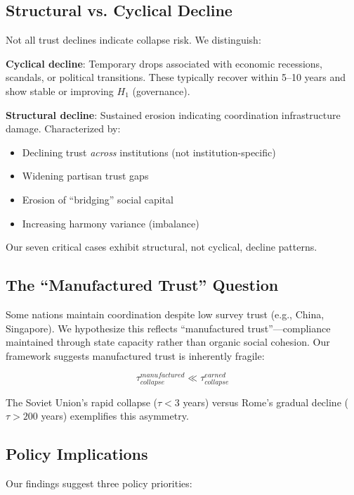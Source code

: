 \documentclass[11pt,a4paper]{article}
\begin{document}
\subsection{Structural vs. Cyclical Decline}

Not all trust declines indicate collapse risk. We distinguish:

\textbf{Cyclical decline}: Temporary drops associated with economic recessions, scandals, or political transitions. These typically recover within 5--10 years and show stable or improving $H_1$ (governance).

\textbf{Structural decline}: Sustained erosion indicating coordination infrastructure damage. Characterized by:
\begin{itemize}
\item Declining trust \textit{across} institutions (not institution-specific)
\item Widening partisan trust gaps
\item Erosion of ``bridging'' social capital
\item Increasing harmony variance (imbalance)
\end{itemize}

Our seven critical cases exhibit structural, not cyclical, decline patterns.

\subsection{The ``Manufactured Trust'' Question}

Some nations maintain coordination despite low survey trust (e.g., China, Singapore). We hypothesize this reflects ``manufactured trust''---compliance maintained through state capacity rather than organic social cohesion. Our framework suggests manufactured trust is inherently fragile:

\begin{equation}
\tau_{collapse}^{manufactured} \ll \tau_{collapse}^{earned}
\end{equation}

The Soviet Union's rapid collapse ($\tau < 3$ years) versus Rome's gradual decline ($\tau > 200$ years) exemplifies this asymmetry.

\subsection{Policy Implications}

Our findings suggest three policy priorities:
\end{document}
